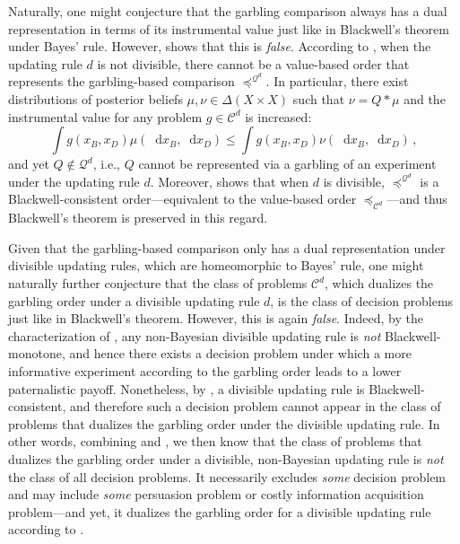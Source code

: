 \documentclass[12pt,letterpaper]{article}
\newenvironment{original}{\color{black}}{}
\theoremstyle{plain}
\theoremstyle{definition}
\theoremstyle{remark}
\newcommand{\C}{\mathcal{C}}
\newcommand{\cQ}{\mathcal{Q}}
\renewcommand*\d{\mathop{}\!\mathrm{d}}
\theoremstyle{definition}
\begin{document}
\begin{original}
Naturally, one might conjecture that the garbling comparison always has a dual representation in terms of its instrumental value just like in Blackwell's theorem under Bayes' rule. However,  shows that this is \textit{false}. According to , when the updating rule $d$ is not divisible, there cannot be a value-based order that represents the garbling-based comparison $\preceq^{\cQ^d}$. In particular, there exist distributions of posterior beliefs $\mu,\nu \in \Delta(X \times X)$ such that $\nu=Q*\mu$ and the instrumental value for any problem $g \in \C^d$ is increased:
\[
\int g(x_B,x_D) \mu(\d x_B, \d x_D) \leq \int g(x_B,x_D) \nu (\d x_B, \d x_D)\,,
\]
and yet $Q \not\in \mathcal{Q}^d$, i.e., $Q$ cannot be represented via a garbling of an experiment under the updating rule $d$. Moreover,  shows that when $d$ is divisible, $\preceq^{\cQ^d}$ is a Blackwell-consistent order---equivalent to the value-based order $\preceq_{\C^d}$---and thus Blackwell's theorem is preserved in this regard.

Given that the garbling-based comparison only has a dual representation under divisible updating rules, which are homeomorphic to Bayes' rule, one might naturally further conjecture that the class of problems $\C^d$, which dualizes the garbling order under a divisible updating rule $d$, is the class of decision problems just like in Blackwell's theorem. However, this is again \textit{false}. Indeed, by the characterization of \citet{whitmeyerforthcomingBlackwell}, any non-Bayesian divisible updating rule is \textit{not} Blackwell-monotone, and hence there exists a decision problem under which a more informative experiment according to the garbling order leads to a lower paternalistic payoff. Nonetheless, by , a divisible updating rule is Blackwell-consistent, and therefore such a decision problem cannot appear in the class of problems that dualizes the garbling order under the divisible updating rule. In other words, combining \citet{whitmeyerforthcomingBlackwell} and , we then know that the class of problems that dualizes the garbling order under a divisible, non-Bayesian updating rule is \textit{not} the class of all decision problems. It necessarily excludes \textit{some} decision problem and may include \textit{some} persuasion problem or costly information acquisition problem---and yet, it dualizes the garbling order for a divisible updating rule according to .
\end{original}
\end{document}
